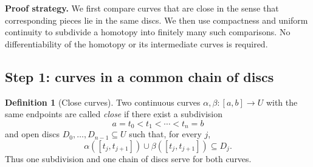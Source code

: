 \documentclass[11pt]{article}
\theoremstyle{plain}
\theoremstyle{definition}
\newtheorem{definition}[theorem]{Definition}
\theoremstyle{remark}
\numberwithin{equation}{section}
\begin{document}
\textbf{Proof strategy.} We first compare
curves that are close in the sense that corresponding pieces lie in the
same discs. We then use compactness and uniform continuity to subdivide
a homotopy into finitely many such comparisons.
No differentiability of the homotopy or its intermediate curves is required.

\begin{center}
\end{center}


\subsection{Step 1: curves in a common chain of discs}
\begin{definition}[Close curves]\label{def:close}
Two continuous curves $\alpha,\beta\colon[a,b]\to U$ with the same
endpoints are called \emph{close} if there exist a subdivision
\[
 a=t_0<t_1<\cdots<t_n=b
\]
and open discs $D_0,\ldots,D_{n-1}\subseteq U$ such that, for every $j$,
\[
 \alpha([t_j,t_{j+1}])\cup\beta([t_j,t_{j+1}])\subseteq D_j.
\]
Thus one subdivision and one chain of discs serve for both curves.
\end{definition}
\end{document}
